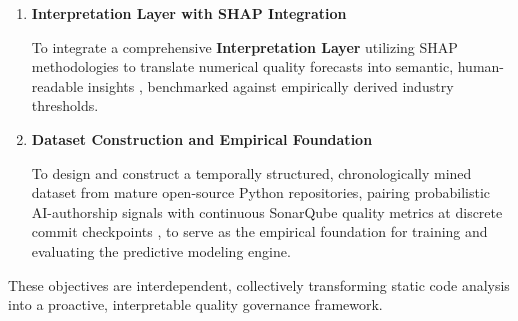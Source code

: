 \begin{enumerate}
    \item \textbf{Interpretation Layer with SHAP Integration}

    To integrate a comprehensive \textbf{Interpretation Layer} utilizing SHAP methodologies \parencite{perspective_on_xai_methods_shap_and_lime, comparative_analysis_lime_shap_interpreters_diabetes} to translate numerical quality forecasts into semantic, human-readable insights \parencite{explainability_testing_ai_shap_lime_testriq}, benchmarked against empirically derived industry thresholds.

    \item \textbf{Dataset Construction and Empirical Foundation}

    To design and construct a temporally structured, chronologically mined dataset from mature open-source Python repositories, pairing probabilistic AI-authorship signals with continuous SonarQube quality metrics at discrete commit checkpoints \parencite{fault_prediction_software_metrics_sonarqube_rules}, to serve as the empirical foundation for training and evaluating the predictive modeling engine.

\end{enumerate}

\vspace{0.5cm}

These objectives are interdependent, collectively transforming static code analysis into a proactive, interpretable quality governance framework.
